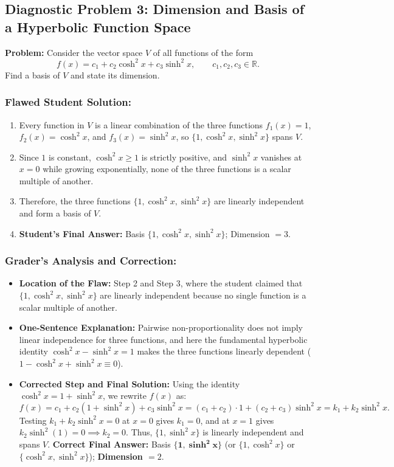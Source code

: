 \documentclass[11pt,a4paper]{article}
\begin{document}
\subsection*{Diagnostic Problem 3: Dimension and Basis of a Hyperbolic Function Space}
\textbf{Problem:} Consider the vector space $V$ of all functions of the form
\[
    f(x) = c_1 + c_2 \cosh^2 x + c_3 \sinh^2 x, \qquad c_1, c_2, c_3 \in \mathbb{R}.
\]
Find a basis of $V$ and state its dimension.

\subsubsection*{Flawed Student Solution:}
\begin{enumerate}
    \item Every function in $V$ is a linear combination of the three functions $f_1(x) = 1$, $f_2(x) = \cosh^2 x$, and $f_3(x) = \sinh^2 x$, so $\{1, \cosh^2 x, \sinh^2 x\}$ spans $V$.
    \item Since $1$ is constant, $\cosh^2 x \ge 1$ is strictly positive, and $\sinh^2 x$ vanishes at $x = 0$ while growing exponentially, none of the three functions is a scalar multiple of another.
    \item Therefore, the three functions $\{1, \cosh^2 x, \sinh^2 x\}$ are linearly independent and form a basis of $V$.
    \item \textbf{Student's Final Answer:} Basis $\{1, \cosh^2 x, \sinh^2 x\}$; Dimension $= 3$.
\end{enumerate}

\subsubsection*{Grader's Analysis and Correction:}
\begin{itemize}
    \item \textbf{Location of the Flaw:} Step 2 and Step 3, where the student claimed that $\{1, \cosh^2 x, \sinh^2 x\}$ are linearly independent because no single function is a scalar multiple of another.
    \item \textbf{One-Sentence Explanation:} Pairwise non-proportionality does not imply linear independence for three functions, and here the fundamental hyperbolic identity $\cosh^2 x - \sinh^2 x = 1$ makes the three functions linearly dependent ($1 - \cosh^2 x + \sinh^2 x \equiv 0$).
    \item \textbf{Corrected Step and Final Solution:}
    Using the identity $\cosh^2 x = 1 + \sinh^2 x$, we rewrite $f(x)$ as:
    \[
        f(x) = c_1 + c_2(1 + \sinh^2 x) + c_3 \sinh^2 x = (c_1 + c_2)\cdot 1 + (c_2 + c_3)\sinh^2 x = k_1 + k_2 \sinh^2 x.
    \]
    Testing $k_1 + k_2 \sinh^2 x = 0$ at $x = 0$ gives $k_1 = 0$, and at $x = 1$ gives $k_2 \sinh^2(1) = 0 \implies k_2 = 0$. Thus, $\{1, \sinh^2 x\}$ is linearly independent and spans $V$.
    \textbf{Correct Final Answer:} Basis $\mathbf{\{1, \sinh^2 x\}}$ (or $\{1, \cosh^2 x\}$ or $\{\cosh^2 x, \sinh^2 x\}$); \textbf{Dimension $= 2$}.
\end{itemize}
\end{document}
